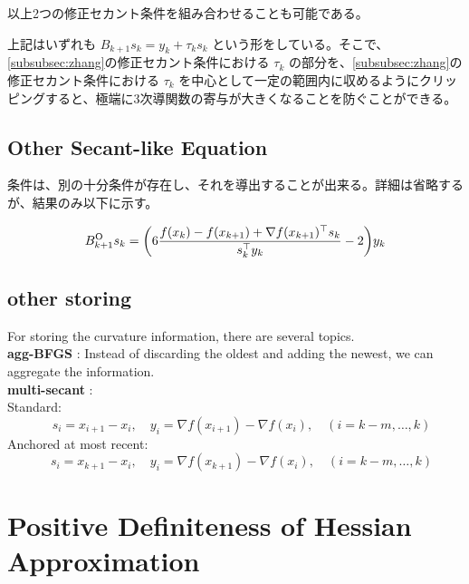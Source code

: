 \documentclass[a4paper, 10pt, dvipdfmx,draft]{article}
\begin{document}
以上2つの修正セカント条件を組み合わせることも可能である。

上記はいずれも $B_{k+1} s_k = y_k + \tau_k s_k$ という形をしている。そこで、\cref{subsubsec:zhang}の修正セカント条件における $\tau_k$ の部分を、\cref{subsubsec:zhang}の修正セカント条件における $\tau_k$ を中心として一定の範囲内に収めるようにクリッピングすると、極端に3次導関数の寄与が大きくなることを防ぐことができる。

\subsection{Other Secant-like Equation}

条件は、別の十分条件が存在し、それを導出することが出来る。詳細は省略するが、結果のみ以下に示す。

\begin{equation*}
    B^\mathrm{O}_{k+1} s_k = \qty(6\frac{f(x_k) - f(x_{k+1}) + \nabla f(x_{k+1})^\top s_k}{s_k^\top y_k}-2) y_k
\end{equation*}

\subsection{other storing}

For storing the curvature information, there are several topics.\\

\textbf{agg-BFGS} \citep{berahasLimitedmemoryBFGSDisplacement2022}: Instead of discarding the oldest and adding the newest, we can aggregate the information.\\

\textbf{multi-secant} \citep{leeAdvancingMultiSecantQuasiNewton2025}:\\
\quad Standard:
\begin{equation*}
    \quad s_i = x_{i+1} - x_i, \quad y_i = \nabla f(x_{i+1}) - \nabla f(x_i), \quad (i = k-m, \ldots, k)
\end{equation*}
\quad Anchored at most recent:
\begin{equation*}
    \quad s_i = x_{k+1} - x_i, \quad y_i = \nabla f(x_{k+1}) - \nabla f(x_i), \quad (i = k-m, \ldots, k)
\end{equation*}


\section{Positive Definiteness of Hessian Approximation}
\end{document}
